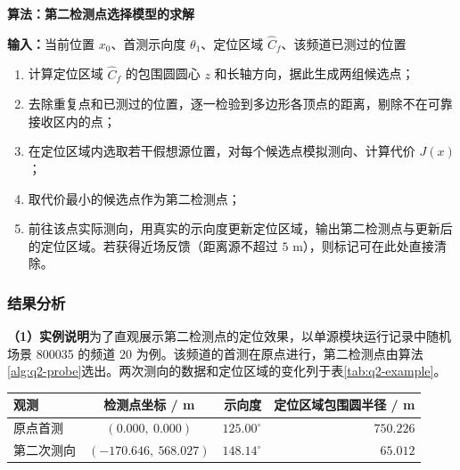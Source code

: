 \begin{center}
\begin{minipage}{\linewidth}
\centering
\QTwoFlowFigure
{}
\label{fig:q2-flow}
\end{minipage}
\end{center}

\par\medskip
\noindent\begin{minipage}{\linewidth}
\small
{}\label{alg:q2-probe}
\textbf{算法\thealgorithm：第二检测点选择模型的求解}\par\smallskip
\noindent\textbf{输入：}当前位置 $x_0$、首测示向度 $\theta_1$、定位区域 $\widehat C_f$、该频道已测过的位置
\begin{enumerate}
\setlength{\itemsep}{2pt}
\setlength{\parskip}{0pt}
\item 计算定位区域 $\widehat C_f$ 的包围圆圆心 $z$ 和长轴方向，据此生成两组候选点；
\item 去除重复点和已测过的位置，逐一检验到多边形各顶点的距离，剔除不在可靠接收区内的点；
\item 在定位区域内选取若干假想源位置，对每个候选点模拟测向、计算代价 $J(x)$；
\item 取代价最小的候选点作为第二检测点；
\item 前往该点实际测向，用真实的示向度更新定位区域，输出第二检测点与更新后的定位区域。若获得近场反馈（距离源不超过 $5$ m），则标记可在此处直接清除。
\end{enumerate}
\end{minipage}
\par\medskip

\Needspace{62mm}
\subsubsection{结果分析}\label{sec:q2-4}

\textbf{（1）实例说明}为了直观展示第二检测点的定位效果，以单源模块运行记录中随机场景 800035 的频道 $20$ 为例。该频道的首测在原点进行，第二检测点由算法\ref{alg:q2-probe}选出。两次测向的数据和定位区域的变化列于表\ref{tab:q2-example}。

\Needspace{38mm}
\begin{center}
\begin{minipage}{\linewidth}
\centering\small
{}
\label{tab:q2-example}
\vspace{4pt}
\begin{tabular}{@{}lcrr@{}}
\toprule
观测 & 检测点坐标 / m & 示向度 & 定位区域包围圆半径 / m \\
\midrule
原点首测 & $(0.000,\ 0.000)$ & $125.00^\circ$ & $750.226$ \\
第二次测向 & $(-170.646,\ 568.027)$ & $148.14^\circ$ & $65.012$ \\
\bottomrule
\end{tabular}
\end{minipage}
\end{center}


